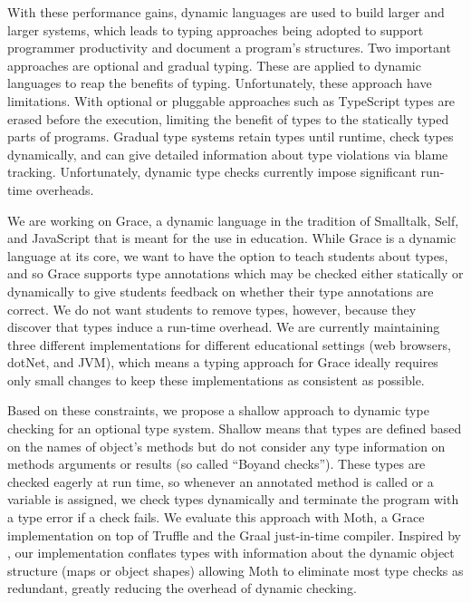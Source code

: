 With these performance gains,
dynamic languages are used to build larger and larger systems,
which leads to typing approaches being adopted
to support programmer productivity and document a program's structures.
Two important approaches are optional\citep{GiladPluggable2004}
and gradual typing\citep{Siek2006,Siek2015}.
These are applied to dynamic languages to reap the benefits of typing.
Unfortunately, these approach have limitations.
With optional or pluggable  approaches such as 
TypeScript \cite{typeScriptECOOP,GiladPluggable2004}
%
types are erased before the execution,
limiting the benefit of types to the statically typed parts of programs.
Gradual type systems retain types until runtime, check types dynamically, and
can give detailed information about type violations via blame 
tracking\citep{Siek2015,blame2009}.
Unfortunately, dynamic type checks currently impose significant run-time overheads\citep{Takikawa2016,Vitousek2017,Muehlboeck2017,Bauman2017,Richards2017,Stulova2016,Greenman2018}.


We are working on Grace\citep{graceOnward12}, a dynamic language in
the tradition of Smalltalk\citep{bluebook}, Self\citep{Self}, and
JavaScript that is meant for the use in
education\citep{graceSigcse13}.  While Grace is a dynamic language at
its core, we want to have the option to teach students about types,
and so Grace supports type annotations which may be checked either
statically or dynamically to give students feedback on whether their
type annotations are correct.  We do not want students to remove
types, however, because they discover that types induce a run-time
overhead.  We are currently maintaining three different
implementations for different educational settings (web browsers, dotNet,
and JVM), which means a typing approach for Grace ideally requires
only small changes to keep these implementations as consistent as
possible.

Based on these constraints,
we propose a shallow approach to dynamic type checking
for an optional type system.
Shallow means that types are defined based on the names of object's methods
but do not consider any type information on methods arguments or results (so
called ``Boyand checks''\citep{Boyland2014}).
These types are checked eagerly at run time, so whenever 
an annotated method is called or a variable is assigned,
we check types dynamically and terminate the program with a type error
if a check fails. We evaluate this approach with Moth,
a Grace implementation on top of Truffle
and the Graal just-in-time compiler\citep{Wurthinger2013,Wurthinger:2017:PPE}.
Inspired by \citet{Richards2017,Bauman2017},
our implementation conflates types
with information about the dynamic object structure 
(maps\citep{Self} or object shapes\citep{woss2014object})
allowing Moth to eliminate most type checks as redundant, greatly
reducing the overhead of dynamic checking.

